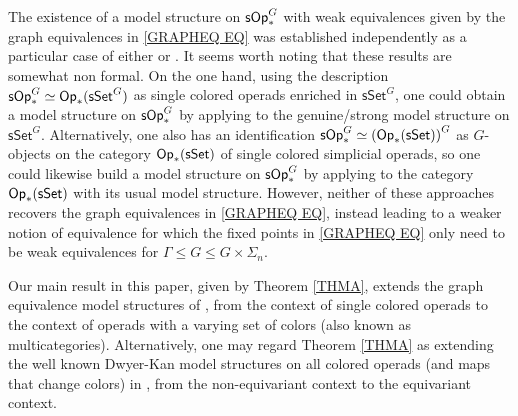 \documentclass[a4paper,10pt
,draft
]{article}%
\numberwithin{equation}{section}
\numberwithin{figure}{section}
\theoremstyle{definition} %
\newcommand{\1}{\ensuremath{\mathbbm 1}}%
\begin{document}
The existence of a model structure 
on $\mathsf{sOp}^G_{\**}$
with weak equivalences given by the graph equivalences
in \eqref{GRAPHEQ EQ}
was established independently as a particular case of either
\cite[Thm. I]{BP_geo} or \cite[Thm. 3.1]{GW18}.
It seems worth noting that these results are somewhat non formal.
On the one hand, using the description 
$\mathsf{sOp}_{\**}^G \simeq \mathsf{Op}_{\**}(\mathsf{sSet}^G)$
as single colored operads enriched in 
$\mathsf{sSet}^G$,
one could obtain a model structure
on $\mathsf{sOp}_{\**}^G$
by applying \cite[Thm. 3.2]{BM03}
to the genuine/strong model structure on $\mathsf{sSet}^G$.
Alternatively, one also has an identification
$\mathsf{sOp}_{\**}^G \simeq 
\left(\mathsf{Op}_{\**}(\mathsf{sSet})\right)^G$
as $G$-objects on the category
$\mathsf{Op}_{\**}(\mathsf{sSet})$
of single colored simplicial operads,
so one could likewise build a model structure on 
$\mathsf{sOp}_{\**}^G$
by applying \cite[Prop. 2.6]{Ste16}
to the category
$\mathsf{Op}_{\**}(\mathsf{sSet})$
with its usual model structure.
However, neither of these approaches
recovers the graph equivalences in \eqref{GRAPHEQ EQ},
instead leading to a weaker notion of equivalence for which the fixed points in \eqref{GRAPHEQ EQ}
only need to be weak equivalences for
$\Gamma \leq G \leq G \times \Sigma_n$.


Our main result in this paper, 
given by Theorem \ref{THMA}, 
extends the graph equivalence model structures of
\cite[Thm. I]{BP_geo}, \cite[Thm. 3.1]{GW18}
from the context of single colored operads 
to the context of operads with a varying set of colors
(also known as multicategories).
Alternatively, one may regard Theorem \ref{THMA} as extending the well known Dwyer-Kan model structures on all colored operads (and maps that change colors) in
\cite[Thm 1.14]{CM13b}, \cite[Thm. 2]{Rob11}
from the non-equivariant context to the 
equivariant context.


\end{document}
